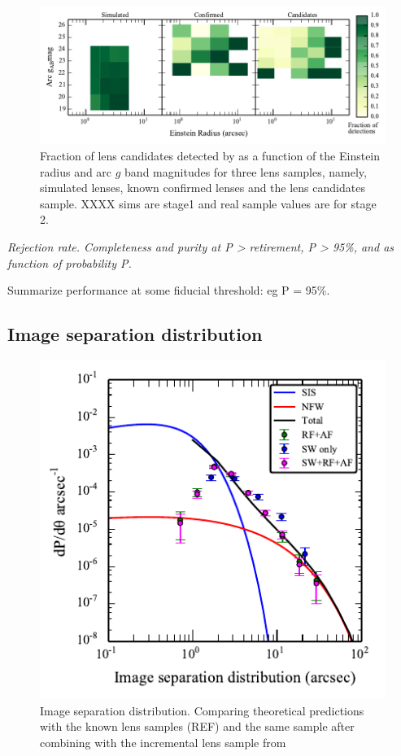 \documentclass[useAMS,usenatbib,a4paper]{mn2e}
\begin{document}
\begin{figure}
\begin{center}
\includegraphics[scale=1.0]{sw-cfhtls-figs/comp_reinst_mag.pdf}
\caption{ \label{fig:compre} Fraction of lens candidates detected by \sw
as a function of the Einstein radius and arc $g$ band magnitudes for
three lens samples, namely, simulated lenses, known confirmed lenses and
the lens candidates sample. XXXX sims are stage1 and real sample values
are for stage 2. }
\end{center}
\end{figure}


{\it Rejection rate. Completeness and purity at P > retirement, P > 95\%, and 
as function of probability P. 

Summarize performance at some fiducial threshold: eg P = 95\%.}

\subsection{Image separation distribution}
\label{sec:results:isd}


\begin{figure}
\begin{center}
\includegraphics[scale=1.2]{sw-cfhtls-figs/isd_cfhtls_sw.pdf}
\caption{ \label{fig:isd} Image separation distribution. Comparing
theoretical predictions with the \cfhtls known lens samples (REF) and
the same \cfhtls sample after combining with the incremental lens sample
from \sw }
\end{center}
\end{figure}
\end{document}
